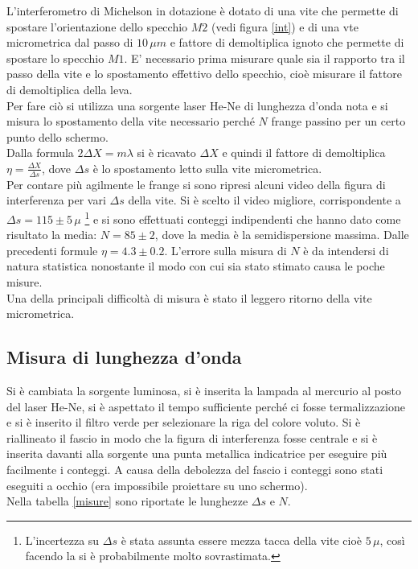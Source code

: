 \documentclass[10pt,a4paper]{article}
\begin{document}
L'interferometro di Michelson in dotazione è dotato di una vite che permette di spostare l'orientazione dello specchio $M2$ (vedi figura \ref{int}) e di una vte micrometrica dal passo di $10 \, \mu m$ e fattore di demoltiplica ignoto che permette di spostare lo specchio $M1$. E' necessario prima misurare quale sia il rapporto tra il passo della vite e lo spostamento effettivo dello specchio, cioè misurare il fattore di demoltiplica della leva. \\
Per fare ciò si utilizza una sorgente laser He-Ne di lunghezza d'onda nota e si misura lo spostamento della vite necessario perché $N$ frange passino per un certo punto dello schermo. \\
Dalla formula $2 \Delta X = m \lambda$ si è ricavato $\Delta X$ e quindi il fattore di demoltiplica $\eta = \frac{\Delta X}{\Delta s}$, dove $\Delta s$ è lo spostamento letto sulla vite micrometrica.\\
Per contare più agilmente le frange si sono ripresi alcuni video della figura di interferenza per vari $\Delta s$ della vite. Si è scelto il video migliore, corrispondente a $\Delta s = 115 \pm 5 \, \mu $ \footnote{L'incertezza su $\Delta s$ è stata assunta essere mezza tacca della vite cioè $5 \, \mu$, così facendo la si è probabilmente molto sovrastimata.} e si sono effettuati conteggi indipendenti che hanno dato come risultato la media: $N = 85 \pm 2$, dove la media è la semidispersione massima. Dalle precedenti formule $\eta = 4.3 \pm 0.2$. L'errore sulla misura di $N$ è da intendersi di natura statistica nonostante il modo con cui sia stato stimato causa le poche misure.\\
Una della principali difficoltà di misura è stato il leggero ritorno della vite micrometrica.\\


\subsection{Misura di lunghezza d'onda}
Si è cambiata la sorgente luminosa, si è inserita la lampada al mercurio al posto del laser He-Ne, si è aspettato il tempo sufficiente perché ci fosse termalizzazione e si è inserito il filtro verde per selezionare la riga del colore voluto. Si è riallineato il fascio in modo che la figura di interferenza fosse centrale e si è inserita davanti alla sorgente una punta metallica indicatrice per eseguire più facilmente i conteggi. A causa della debolezza del fascio i conteggi sono stati eseguiti a occhio (era impossibile proiettare su uno schermo).\\
Nella tabella \ref{misure} sono riportate le lunghezze $\Delta s$ e $N$.\\
\end{document}
